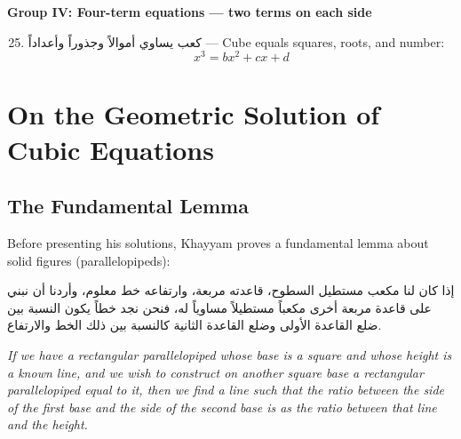 \begin{propositionbox}
\begin{enumerate}
\end{enumerate}

\textbf{Group IV: Four-term equations --- two terms on each side}

\begin{enumerate}
[label=\arabic*.,resume,noitemsep]    
\setcounter{enumi}{24}
\item 
\textarabic{كعب يساوي أموالاً وجذوراً وأعداداً} --- Cube equals squares, roots, and number:    $$x^3 = b x^2 + c x + d$$

\end{enumerate}

\end{propositionbox}

\clearpage

\section{On the Geometric Solution of Cubic Equations}

\label{sec:geometric}


\subsection{The Fundamental Lemma}

\label{subsec:lemma}
Before presenting his solutions, Khayyam proves a fundamental lemma about solid figures (parallelopipeds):

\begin{propositionbox}

\begin{Arabic}
إذا كان لنا مكعب مستطيل السطوح، قاعدته مربعة، وارتفاعه خط معلوم، وأردنا أن نبني على قاعدة مربعة أخرى مكعباً مستطيلاً مساوياً له، فنحن نجد خطاً يكون النسبة بين ضلع القاعدة الأولى وضلع القاعدة الثانية كالنسبة بين ذلك الخط والارتفاع.

\end{Arabic}

\textit{If we have a rectangular parallelopiped whose base is a square and whose height is a known line, and we wish to construct on another square base a rectangular parallelopiped equal to it, then we find a line such that the ratio between the side of the first base and the side of the second base is as the ratio between that line and the height.}

\end{propositionbox}

